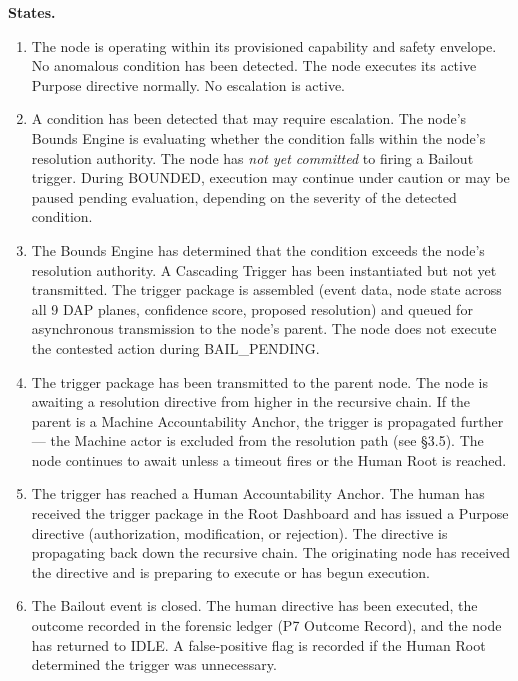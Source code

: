 \bigskip
\noindent\textbf{States.}

\begin{enumerate}

\item[\textbf{IDLE}] The node is operating within its provisioned capability and safety envelope. No anomalous condition has been detected. The node executes its active Purpose directive normally. No escalation is active.

\item[\textbf{BOUNDED}] A condition has been detected that may require escalation. The node's Bounds Engine is evaluating whether the condition falls within the node's resolution authority. The node has \emph{not yet committed} to firing a Bailout trigger. During BOUNDED, execution may continue under caution or may be paused pending evaluation, depending on the severity of the detected condition.

\item[\textbf{BAIL\_PENDING}] The Bounds Engine has determined that the condition exceeds the node's resolution authority. A Cascading Trigger has been instantiated but not yet transmitted. The trigger package is assembled (event data, node state across all 9 DAP planes, confidence score, proposed resolution) and queued for asynchronous transmission to the node's parent. The node does not execute the contested action during BAIL\_PENDING.

\item[\textbf{ESCALATING}] The trigger package has been transmitted to the parent node. The node is awaiting a resolution directive from higher in the recursive chain. If the parent is a Machine Accountability Anchor, the trigger is propagated further — the Machine actor is excluded from the resolution path (see \S 3.5). The node continues to await unless a timeout fires or the Human Root is reached.

\item[\textbf{HUMAN\_ACKNOWLEDGED}] The trigger has reached a Human Accountability Anchor. The human has received the trigger package in the Root Dashboard and has issued a Purpose directive (authorization, modification, or rejection). The directive is propagating back down the recursive chain. The originating node has received the directive and is preparing to execute or has begun execution.

\item[\textbf{RESOLVED}] The Bailout event is closed. The human directive has been executed, the outcome recorded in the forensic ledger (P7 Outcome Record), and the node has returned to IDLE. A false-positive flag is recorded if the Human Root determined the trigger was unnecessary.

\end{enumerate}


